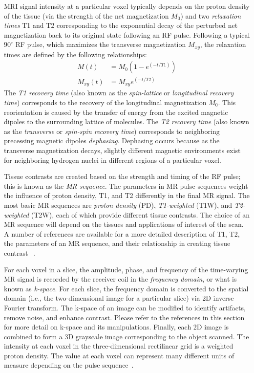MRI signal intensity at a particular voxel typically depends on the proton density of the tissue (via the strength of the net magnetization $M_0$) and two \textit{relaxation times} T1 and T2 corresponding to the exponential decay of the perturbed net magnetization back to its original state following an RF pulse. Following a typical $90^{\circ}$ RF pulse, which maximizes the transverse magnetization $M_{xy}$, the relaxation times are defined by the following relationships:
\begin{align}
M(t) &= M_0(1 - e^{(-t/T1)}) \\
M_{xy}(t) &= M_{xy}e^{(-t/T2)}
\end{align}
The \textit{T1 recovery time} (also known as the \textit{spin-lattice} or \textit{longitudinal recovery time}) corresponds to the recovery of the longitudinal magnetization $M_0$. This reorientation is caused by the transfer of energy from the excited magnetic dipoles to the surrounding lattice of molecules. The \textit{T2 recovery time}  (also known as the \textit{transverse} or \textit{spin-spin recovery time}) corresponds to neighboring precessing magnetic dipoles \textit{dephasing}. Dephasing occurs because as the transverse magnetization decays, slightly different magnetic environments exist for neighboring hydrogen nuclei in different regions of a particular voxel.

Tissue contrasts are created based on the strength and timing of the RF pulse; this is known as the \textit{MR sequence}. The parameters in MR pulse sequences weight the influence of proton density, T1, and T2 differently in the final MR signal. The most basic MR sequences are \textit{proton density} (PD), \textit{T1-weighted} (T1W), and \textit{T2-weighted} (T2W), each of which provide different tissue contrasts. The choice of an MR sequence will depend on the tissues and applications of interest of the scan. A number of references are available for a more detailed description of T1, T2, the parameters of an MR sequence, and their relationship in creating tissue contrast~\cite{nishimura_2010, brown_semelka_2003, webb_2003} .

For each voxel in a slice, the amplitude, phase, and frequency of the time-varying MR signal is recorded by the receiver coil in the \textit{frequency domain}, or what is known as \textit{k-space}. For each slice, the frequency domain is converted to the spatial domain (i.e., the two-dimensional image for a particular slice) via 2D inverse Fourier transform. The k-space of an image can be modified to identify artifacts, remove noise, and enhance contrast. Please refer to the references in this section for more detail on k-space and its manipulations. Finally, each 2D image is combined to form a 3D grayscale image corresponding to the object scanned. The intensity at each voxel in the three-dimensional rectilinear grid is a weighted proton density. The value at each voxel can represent many different units of measure depending on the pulse sequence~\cite{beek_hoffman_2008}.

